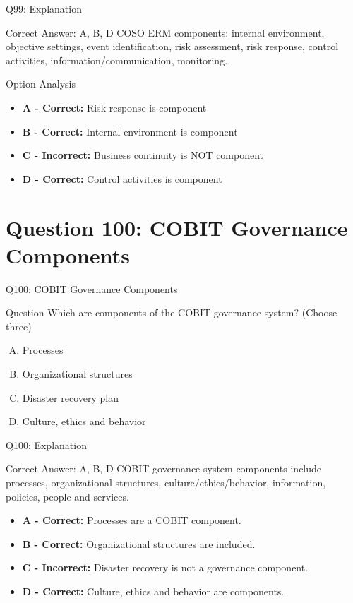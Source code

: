 \documentclass{beamer}
\begin{document}
	\begin{frame}{Q99: Explanation}
		\begin{block}{Correct Answer: A, B, D}
			COSO ERM components: internal environment, objective settings, event identification, risk assessment, risk response, control activities, information/communication, monitoring.
		\end{block}
		\begin{block}{Option Analysis}
			\begin{itemize}
				\item \textbf{A - Correct:} Risk response is component
				\item \textbf{B - Correct:} Internal environment is component
				\item \textbf{C - Incorrect:} Business continuity is NOT component
				\item \textbf{D - Correct:} Control activities is component
			\end{itemize}
		\end{block}
	\end{frame}
	
	
	
	\section{Question 100: COBIT Governance Components}
	
	\begin{frame}{Q100: COBIT Governance Components}
		\begin{block}{Question}
			Which are components of the COBIT governance system?
			(Choose three)
		\end{block}
		
		\begin{enumerate}[(A)]
			\item Processes
			\item Organizational structures
			\item Disaster recovery plan
			\item Culture, ethics and behavior
		\end{enumerate}
	\end{frame}
	
	\begin{frame}{Q100: Explanation}
		\begin{block}{Correct Answer: A, B, D}
			COBIT governance system components include processes,
			organizational structures, culture/ethics/behavior,
			information, policies, people and services.
		\end{block}
		
		\begin{itemize}
			\item \textbf{A - Correct:} Processes are a COBIT component.
			\item \textbf{B - Correct:} Organizational structures are included.
			\item \textbf{C - Incorrect:} Disaster recovery is not a governance component.
			\item \textbf{D - Correct:} Culture, ethics and behavior are components.
		\end{itemize}
	\end{frame}
	
\end{document}
